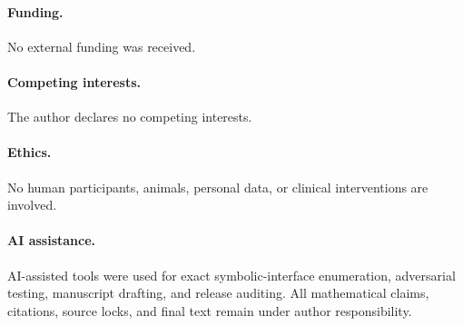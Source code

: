 \documentclass[11pt]{article}
\theoremstyle{definition}
\theoremstyle{remark}
\begin{document}
\paragraph{Funding.}
No external funding was received.

\paragraph{Competing interests.}
The author declares no competing interests.

\paragraph{Ethics.}
No human participants, animals, personal data, or clinical interventions
are involved.

\paragraph{AI assistance.}
AI-assisted tools were used for exact symbolic-interface enumeration,
adversarial testing, manuscript drafting, and release auditing.  All
mathematical claims, citations, source locks, and final text remain under
author responsibility.



\end{document}
